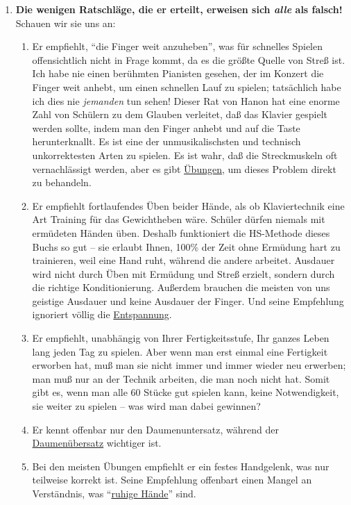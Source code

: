\begin{enumerate}[label={\roman*.}]
\item \label{c1iii7h7}\textbf{Die wenigen Ratschläge, die er erteilt, erweisen sich \textit{alle} als falsch!}
Schauen wir sie uns an:

\begin{enumerate}[label=\alph*)]
\item Er empfiehlt, \enquote{die Finger weit anzuheben}, was für schnelles Spielen offensichtlich nicht in Frage kommt, da es die größte Quelle von Streß ist.
Ich habe nie einen berühmten Pianisten gesehen, der im Konzert die Finger weit anhebt, um einen schnellen Lauf zu spielen; tatsächlich habe ich dies nie \textit{jemanden} tun sehen!
Dieser Rat von Hanon hat eine enorme Zahl von Schülern zu dem Glauben verleitet, daß das Klavier gespielt werden sollte, indem man den Finger anhebt und auf die Taste herunterknallt.
Es ist eine der unmusikalischsten und technisch unkorrektesten Arten zu spielen.
Es ist wahr, daß die Streckmuskeln oft vernachlässigt werden, aber es gibt \hyperref[c1iii7finger]{Übungen}, um dieses Problem direkt zu behandeln.

\item Er empfiehlt fortlaufendes Üben beider Hände, als ob Klaviertechnik eine Art Training für das Gewichtheben wäre.
Schüler dürfen niemals mit ermüdeten Händen üben.
Deshalb funktioniert die HS-Methode dieses Buchs so gut -- sie erlaubt Ihnen, 100\% der Zeit ohne Ermüdung hart zu trainieren, weil eine Hand ruht, während die andere arbeitet.
Ausdauer wird nicht durch Üben mit Ermüdung und Streß erzielt, sondern durch die richtige Konditionierung.
Außerdem brauchen die meisten von uns geistige Ausdauer und keine Ausdauer der Finger.
Und seine Empfehlung ignoriert völlig die \hyperref[c1ii14]{Entspannung}.

\item Er empfiehlt, unabhängig von Ihrer Fertigkeitsstufe, Ihr ganzes Leben lang jeden Tag zu spielen.
Aber wenn man erst einmal eine Fertigkeit erworben hat, muß man sie nicht immer und immer wieder neu erwerben; man muß nur an der Technik arbeiten, die man noch nicht hat.
Somit gibt es, wenn man alle 60 Stücke gut spielen kann, keine Notwendigkeit, sie weiter zu spielen -- was wird man dabei gewinnen?

\item Er kennt offenbar nur den Daumenuntersatz, während der \hyperref[c1iii5a]{Daumenübersatz} wichtiger ist.

\item Bei den meisten Übungen empfiehlt er ein festes Handgelenk, was nur teilweise korrekt ist.
Seine Empfehlung offenbart einen Mangel an Verständnis, was \enquote{\hyperref[ruhig]{ruhige Hände}} sind.


\end{enumerate}
\end{enumerate}
